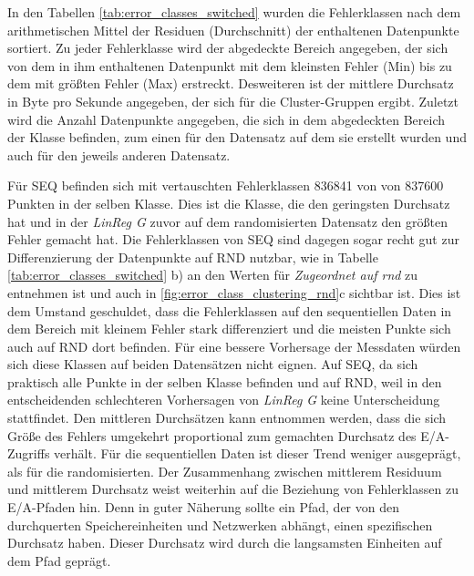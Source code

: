 \documentclass[
	12pt,
	a4paper,
	BCOR10mm,
	DIV14,
	listof=totoc,
	bibliography=totoc,
	headsepline
]{scrreprt}
\begin{document}
In den Tabellen \ref{tab:error_classes_switched} wurden die Fehlerklassen nach dem arithmetischen Mittel der Residuen (Durchschnitt) der enthaltenen Datenpunkte sortiert.
Zu jeder Fehlerklasse wird der abgedeckte Bereich angegeben, der sich von dem in ihm enthaltenen Datenpunkt mit dem kleinsten Fehler (Min) bis zu dem mit größten Fehler (Max) erstreckt. 
Desweiteren ist der mittlere Durchsatz in Byte pro Sekunde angegeben, der sich für die Cluster-Gruppen ergibt.
Zuletzt wird die Anzahl Datenpunkte angegeben, die sich in dem abgedeckten Bereich der Klasse befinden, zum einen für den Datensatz auf dem sie erstellt wurden und auch für den jeweils anderen Datensatz.

Für SEQ befinden sich mit vertauschten Fehlerklassen 836841 von von 837600 Punkten in der selben Klasse.
Dies ist die Klasse, die den geringsten Durchsatz hat und in der \textit{LinReg G} zuvor auf dem randomisierten Datensatz den größten Fehler gemacht hat.
Die Fehlerklassen von SEQ sind dagegen sogar recht gut zur Differenzierung der Datenpunkte auf RND nutzbar, wie in Tabelle \ref{tab:error_classes_switched} b) an den Werten für \textit{Zugeordnet auf rnd} zu entnehmen ist und auch in \ref{fig:error_class_clustering_rnd}c sichtbar ist.
Dies ist dem Umstand geschuldet, dass die Fehlerklassen auf den sequentiellen Daten in dem Bereich mit kleinem Fehler stark differenziert und die meisten Punkte sich auch auf RND dort befinden.
Für eine bessere Vorhersage der Messdaten würden sich diese Klassen auf beiden Datensätzen nicht eignen.
Auf SEQ, da sich praktisch alle Punkte in der selben Klasse befinden und auf RND, weil in den entscheidenden schlechteren Vorhersagen von \textit{LinReg G} keine Unterscheidung stattfindet.
Den mittleren Durchsätzen kann entnommen werden, dass die sich Größe des Fehlers umgekehrt proportional zum gemachten Durchsatz des E/A-Zugriffs verhält.
Für die sequentiellen Daten ist dieser Trend weniger ausgeprägt, als für die randomisierten. 
Der Zusammenhang zwischen mittlerem Residuum und mittlerem Durchsatz weist weiterhin auf die Beziehung von Fehlerklassen zu E/A-Pfaden hin.
Denn in guter Näherung sollte ein Pfad, der von den durchquerten Speichereinheiten und Netzwerken abhängt, einen spezifischen Durchsatz haben.
Dieser Durchsatz wird durch die langsamsten Einheiten auf dem Pfad geprägt.
\end{document}
